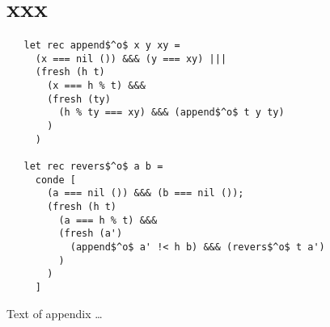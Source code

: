 \documentclass[acmsmall,review,anonymous]{acmart}\settopmatter{printfolios=true,printccs=false,printacmref=false}
\begin{document}
\section{xxx}
\begin{lstlisting}
   let rec append$^o$ x y xy =
     (x === nil ()) &&& (y === xy) |||
     (fresh (h t)
       (x === h % t) &&&
       (fresh (ty)
         (h % ty === xy) &&& (append$^o$ t y ty)
       )
     )

   let rec revers$^o$ a b =
     conde [
       (a === nil ()) &&& (b === nil ());
       (fresh (h t)
         (a === h % t) &&&
         (fresh (a')
           (append$^o$ a' !< h b) &&& (revers$^o$ t a')
         )
       )
     ]
\end{lstlisting}

%


Text of appendix \ldots
\end{document}
